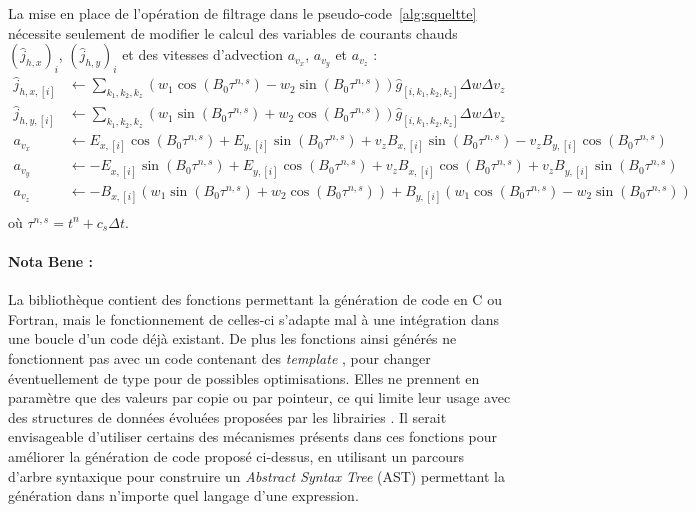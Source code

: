 La mise en place de l'opération de filtrage dans le pseudo-code~\ref{alg:squeltte} nécessite seulement de modifier le calcul des variables de courants chauds $\left(\hat{j}_{h,x}\right)_i$, $\left(\hat{j}_{h,y}\right)_i$ et des vitesses d'advection $a_{v_x}$, $a_{v_y}$ et $a_{v_z}$ :
$$
  \begin{aligned}
    \hat{j}_{h,x,[i]} &\gets \sum_{k_1,k_2,k_z} ( w_1\cos(B_0\tau^{n,s}) - w_2\sin(B_0\tau^{n,s}) ) \hat{g}_{[i,k_1,k_2,k_z]} \Delta w\Delta v_z\\
    \hat{j}_{h,y,[i]} &\gets \sum_{k_1,k_2,k_z} ( w_1\sin(B_0\tau^{n,s}) + w_2\cos(B_0\tau^{n,s}) ) \hat{g}_{[i,k_1,k_2,k_z]} \Delta w\Delta v_z\\
    a_{v_x} &\gets E_{x,[i]}\cos(B_0\tau^{n,s}) + E_{y,[i]}\sin(B_0\tau^{n,s}) + v_zB_{x,[i]}\sin(B_0\tau^{n,s}) - v_zB_{y,[i]}\cos(B_0\tau^{n,s})\\
    a_{v_y} &\gets -E_{x,[i]}\sin(B_0\tau^{n,s}) + E_{y,[i]}\cos(B_0\tau^{n,s}) + v_zB_{x,[i]}\cos(B_0\tau^{n,s}) + v_zB_{y,[i]}\sin(B_0\tau^{n,s})\\
    a_{v_z} &\gets -B_{x,[i]}(w_1\sin(B_0\tau^{n,s}) + w_2\cos(B_0\tau^{n,s})) + B_{y,[i]}(w_1\cos(B_0\tau^{n,s}) - w_2\sin(B_0\tau^{n,s}) )\\
  \end{aligned}
$$
où $\tau^{n,s}=t^n+c_s\Delta t$.

\paragraph{Nota Bene :} La bibliothèque \sympy{} contient des fonctions permettant la génération de code en C ou Fortran, mais le fonctionnement de celles-ci s'adapte mal à une intégration dans une boucle d'un code déjà existant. De plus les fonctions ainsi générés ne fonctionnent pas avec un code contenant des \emph{template} \CC, pour changer éventuellement de type pour de possibles optimisations. Elles ne prennent en paramètre que des valeurs par copie ou par pointeur, ce qui limite leur usage avec des structures de données évoluées proposées par les librairies \CC. Il serait envisageable d'utiliser certains des mécanismes présents dans ces fonctions pour améliorer la génération de code proposé ci-dessus, en utilisant un parcours d'arbre syntaxique pour construire un \emph{Abstract Syntax Tree} (AST) permettant la génération dans n'importe quel langage d'une expression. 

